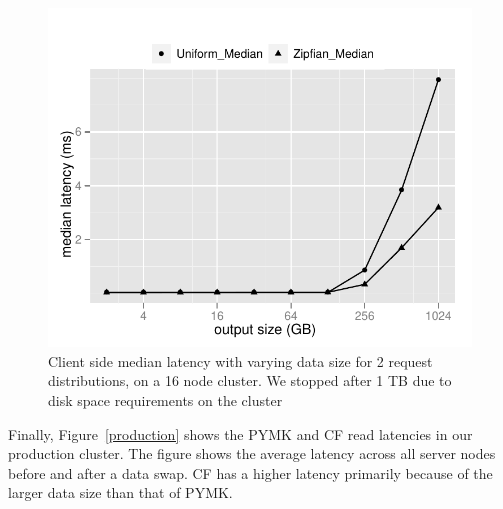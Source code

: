 \begin{figure}
  \centering
    \includegraphics[scale=0.55]{images/search_16node.pdf}
  \caption{Client side median latency with varying data size for 2 request distributions, on a 16 node cluster. We stopped after 1 TB due to disk space requirements on the cluster}
  \label{16search}
\end{figure}

Finally, Figure~\ref{production} shows the PYMK and CF read latencies
in our production cluster. The figure shows the average latency across
all server nodes before and after a data swap. CF has a higher
latency primarily because of the larger data size than that of PYMK.

